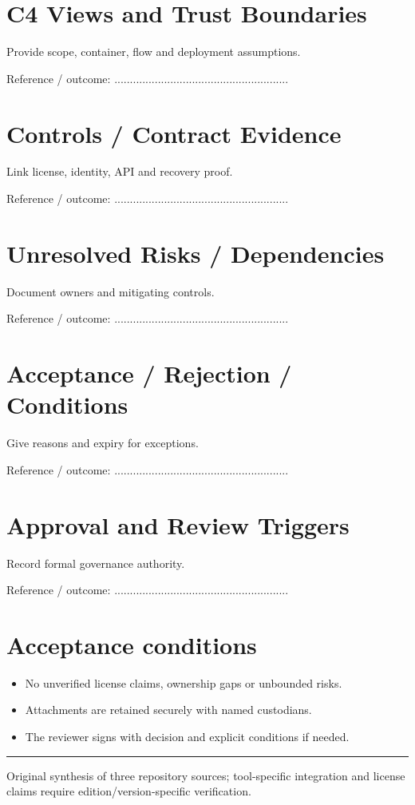 \documentclass[10pt,letterpaper]{article}
\begin{document}
\section{C4 Views and Trust Boundaries}
Provide scope, container, flow and deployment assumptions.\par
Reference / outcome: ........................................................\par
\section{Controls / Contract Evidence}
Link license, identity, API and recovery proof.\par
Reference / outcome: ........................................................\par
\section{Unresolved Risks / Dependencies}
Document owners and mitigating controls.\par
Reference / outcome: ........................................................\par
\section{Acceptance / Rejection / Conditions}
Give reasons and expiry for exceptions.\par
Reference / outcome: ........................................................\par
\section{Approval and Review Triggers}
Record formal governance authority.\par
Reference / outcome: ........................................................\par
\section{Acceptance conditions}
\begin{itemize}
\item No unverified license claims, ownership gaps or unbounded risks.
\item Attachments are retained securely with named custodians.
\item The reviewer signs with decision and explicit conditions if needed.
\end{itemize}
\vfill\noindent\color{muted}\rule{\linewidth}{0.4pt}\par\scriptsize Original synthesis of three repository sources; tool-specific integration and license claims require edition/version-specific verification.\normalsize
\end{document}
